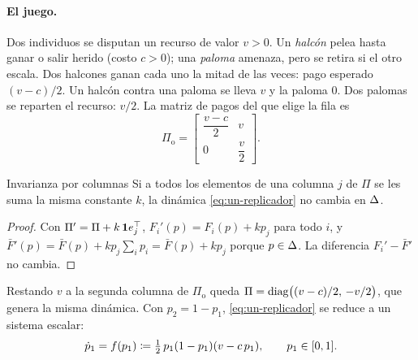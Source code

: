 \paragraph{El juego.} Dos individuos se disputan un recurso de valor $v>0$. Un \emph{halcón} pelea hasta ganar o salir herido (costo $c>0$); una \emph{paloma} amenaza, pero se retira si el otro escala. Dos halcones ganan cada uno la mitad de las veces: pago esperado $(v-c)/2$. Un halcón contra una paloma se lleva $v$ y la paloma $0$. Dos palomas se reparten el recurso: $v/2$. La matriz de pagos del que elige la fila es
\begin{equation}
  \Pi_{\mathrm o}=\begin{bmatrix}\dfrac{v-c}2 & v\\[6pt] 0 & \dfrac v2\end{bmatrix}.
  \label{eq:un-hd}
\end{equation}

\begin{lema}[label=lem:un-columnas]{Invarianza por columnas}
Si a todos los elementos de una columna $j$ de $\Pi$ se les suma la misma constante $k$, la dinámica \eqref{eq:un-replicador} no cambia en $\Delta$.
\end{lema}

\begin{proof}
Con $\Pi'=\Pi+k\,\mathbf1e_j^{\top}$, $F_i'(p)=F_i(p)+kp_j$ para todo $i$, y $\bar F'(p)=\bar F(p)+kp_j\sum_ip_i=\bar F(p)+kp_j$ porque $p\in\Delta$. La diferencia $F_i'-\bar F'$ no cambia.
\end{proof}

Restando $v$ a la segunda columna de $\Pi_{\mathrm o}$ queda $\Pi=\operatorname{diag}\bigl((v-c)/2,\,-v/2\bigr)$, que genera la misma dinámica. Con $p_2=1-p_1$, \eqref{eq:un-replicador} se reduce a un sistema escalar:
\begin{equation}
  \dot p_1=f(p_1)\coloneqq\tfrac12\,p_1(1-p_1)(v-c\,p_1),\qquad p_1\in[0,1] .
  \label{eq:un-hd-escalar}
\end{equation}

